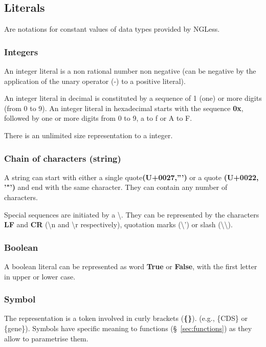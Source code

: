 \documentclass{article}
\begin{document}
\subsection{Literals}
\label{sec:literals}

Are notations for constant values of data types provided by NGLess.

\subsubsection{Integers}

An integer literal is a non rational number non negative (can be negative by the application of the unary operator (-) to a positive literal).

An integer literal in decimal is constituted by a sequence of 1 (one) or more digits (from 0 to 9). An integer literal in hexadecimal starts with the sequence \textbf{0x}, followed by one or more digits from 0 to 9, a to f or A to F.

There is an unlimited size representation to a integer.

\subsubsection{Chain of characters (string)}

A string can start with either a single quote\textbf{(U+0027,''')} or a quote \textbf{(U+0022, '"')} and end with the same character. They can contain any number of characters.

Special sequences are initiated by a \textbackslash. They can be represented by the characters \textbf{LF} and \textbf{CR} (\textbackslash n and \textbackslash r respectively), quotation marks (\textbackslash ') or slash (\textbackslash \textbackslash).

\subsubsection{Boolean}

A boolean literal can be represented as word \textbf{True} or \textbf{False}, with the first letter in upper or lower case.

\subsubsection{Symbol}

The representation is a token involved in curly brackets (\textbf{\{\}}). (e.g., \{CDS\} or \{gene\}). Symbols have specific meaning to functions (§~\ref{sec:functions}) as they allow to parametrise them.
\end{document}
